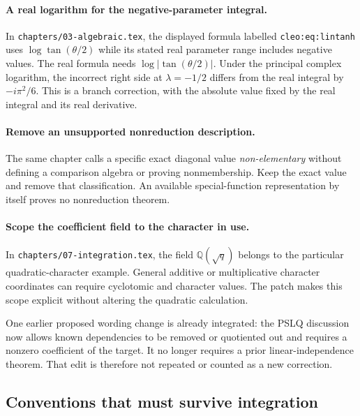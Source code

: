 \paragraph{A real logarithm for the negative-parameter integral.}
In \texttt{chapters/03-algebraic.tex}, the displayed formula labelled
\texttt{cleo:eq:lintanh} uses $\log\tan(\theta/2)$ while its stated
real parameter range includes negative values. The real formula needs
$\log|\tan(\theta/2)|$. Under the principal complex logarithm,
the incorrect right side at $\lambda=-1/2$ differs from the real
integral by $-i\pi^2/6$. This is a branch correction, with the
absolute value fixed by the real integral and its real derivative.

\paragraph{Remove an unsupported nonreduction description.}
The same chapter calls a specific exact diagonal value
\emph{non-elementary} without defining a comparison algebra or proving
nonmembership. Keep the exact value and remove that classification.
An available special-function representation by itself proves no
nonreduction theorem.

\paragraph{Scope the coefficient field to the character in use.}
In \texttt{chapters/07-integration.tex}, the field
$\mathbb Q(\sqrt q)$ belongs to the particular quadratic-character
example. General additive or multiplicative character coordinates
can require cyclotomic and character values. The patch makes this
scope explicit without altering the quadratic calculation.

One earlier proposed wording change is already integrated: the PSLQ
discussion now allows known dependencies to be removed or quotiented
out and requires a nonzero coefficient of the target. It no longer
requires a prior linear-independence theorem. That edit is therefore
not repeated or counted as a new correction.





\subsection{Conventions that must survive integration}

